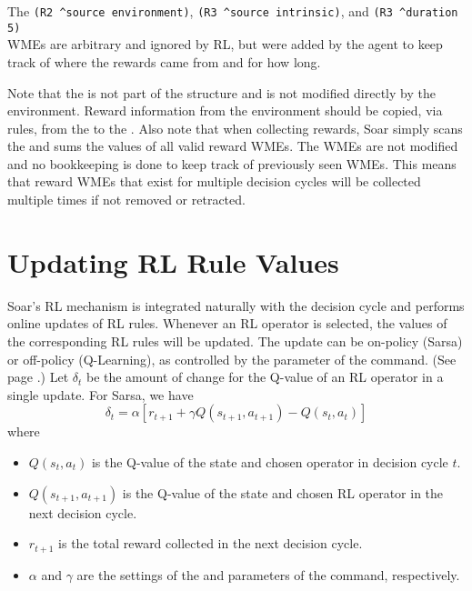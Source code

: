 The \verb=(R2 ^source environment)=, \verb=(R3 ^source intrinsic)=, and \verb=(R3 ^duration 5)= \\
WMEs are arbitrary and ignored by RL, but were added by the agent to keep 
track of where the rewards came from and for how long.

Note that the  is not part of the  structure and is not modified directly by the environment.
Reward information from the environment should be copied, via rules, from the  to the .
Also note that when collecting rewards, Soar simply scans the  and sums the values of all valid reward WMEs.
The WMEs are not modified and no bookkeeping is done to keep track of previously seen WMEs.
This means that reward WMEs that exist for multiple decision cycles will be collected multiple times if not removed or retracted.

\section{Updating RL Rule Values}
\label{RL-algo}

Soar's RL mechanism is integrated naturally with the decision cycle and performs online updates of RL rules.
Whenever an RL operator is selected, the values of the corresponding RL rules will be updated.
The update can be on-policy (Sarsa) or off-policy (Q-Learning), as controlled by the  parameter of the  command. (See page \pageref{rl}.)
Let $\delta_t$ be the amount of change for the Q-value of an RL operator in a single update.
For Sarsa, we have
$$ \delta_t = \alpha \left[ r_{t+1} + \gamma Q(s_{t+1}, a_{t+1}) - Q(s_t, a_t) \right] $$
where 
\begin{itemize}
	\item $Q(s_t, a_t)$ is the Q-value of the state and chosen operator in decision cycle $t$.
	\item $Q(s_{t+1}, a_{t+1})$ is the Q-value of the state and chosen RL operator in the next decision cycle.
	\item $r_{t+1}$ is the total reward collected in the next decision cycle.
	\item $\alpha$ and $\gamma$ are the settings of the  and  parameters of the  command, respectively.
\end{itemize}

